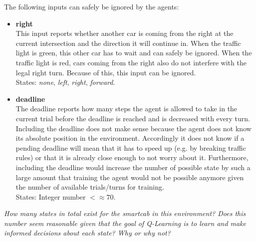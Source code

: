 \documentclass[11pt]{article}
\begin{document}
The following inputs can safely be ignored by the agents:
\begin{itemize}
    \item \textbf{right} \\
        This input reports whether another car is coming from the right at the current intersection and the direction it will continue in. When the traffic light is green, this other car has to wait and can safely be ignored. When the traffic light is red, cars coming from the right also do not interfere with the legal right turn. 
        Because of this, this input can be ignored.\\
        States: \textit{none}, \textit{left}, \textit{right}, \textit{forward}.

    \item \textbf{deadline}\\
        The deadline reports how many steps the agent is allowed to take in the current trial before the deadline
        is reached and is decreased with every turn. Including the deadline does not make sense because the agent does not know its absolute position in the environment. Accordingly it does not know if a pending deadline will mean that it has to speed up (e.g. by breaking traffic rules) or that it is already close enough to not worry about it. Furthermore, including the deadline would increase the number of possible state by such a large amount that training the agent would not be possible anymore given the number of available trials/turns for training.\\
        States: Integer number $<\approx 70$.

\end{itemize}

\textit{How many states in total exist for the smartcab in this environment? Does this number seem reasonable given that the goal of Q-Learning is to learn and make informed decisions about each state? Why or why not?}\\
\end{document}
